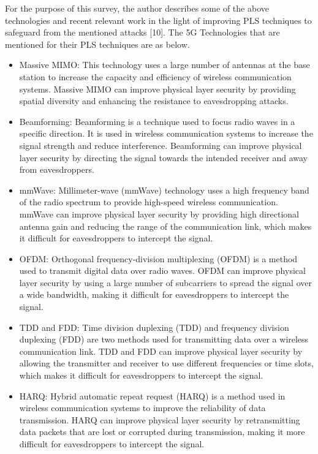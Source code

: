 \documentclass[conference]{IEEEtran}
\begin{document}
For the purpose of this survey, the author describes some of the above technologies and recent relevant work in the light of improving PLS techniques to safeguard from the mentioned attacks [10]. The 5G Technologies that are mentioned for their PLS techniques are as below.
\begin{itemize}
    \item Massive MIMO: This technology uses a large number of antennas at the base station to increase the capacity and efficiency of wireless communication systems. Massive MIMO can improve physical layer security by providing spatial diversity and enhancing the resistance to eavesdropping attacks.
    \item Beamforming: Beamforming is a technique used to focus radio waves in a specific direction. It is used in wireless communication systems to increase the signal strength and reduce interference. Beamforming can improve physical layer security by directing the signal towards the intended receiver and away from eavesdroppers.
    \item mmWave: Millimeter-wave (mmWave) technology uses a high frequency band of the radio spectrum to provide high-speed wireless communication. mmWave can improve physical layer security by providing high directional antenna gain and reducing the range of the communication link, which makes it difficult for eavesdroppers to intercept the signal.
    \item OFDM: Orthogonal frequency-division multiplexing (OFDM) is a method used to transmit digital data over radio waves. OFDM can improve physical layer security by using a large number of subcarriers to spread the signal over a wide bandwidth, making it difficult for eavesdroppers to intercept the signal.
    \item TDD and FDD: Time division duplexing (TDD) and frequency division duplexing (FDD) are two methods used for transmitting data over a wireless communication link. TDD and FDD can improve physical layer security by allowing the transmitter and receiver to use different frequencies or time slots, which makes it difficult for eavesdroppers to intercept the signal.
    \item HARQ: Hybrid automatic repeat request (HARQ) is a method used in wireless communication systems to improve the reliability of data transmission. HARQ can improve physical layer security by retransmitting data packets that are lost or corrupted during transmission, making it more difficult for eavesdroppers to intercept the signal.
\end{itemize}
\end{document}
